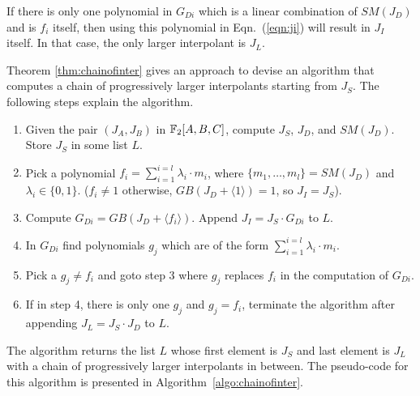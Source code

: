 If there is only one polynomial
in $G_{Di}$ which is a linear combination of $SM(J_D)$ and is $f_i$ itself, then using 
this polynomial in Eqn.~(\ref{eqn:ji}) will result in $J_I$ itself. In that case, 
the only larger interpolant is $J_L$.

\par Theorem \ref{thm:chainofinter} gives an approach to devise an algorithm that computes a chain of progressively larger interpolants starting from $J_S$. The following steps explain the algorithm.
\begin{enumerate}
	\item Given the pair $(J_A,J_B)$ in ${\mathbb{F}}_2[A,B,C]$, compute $J_S$, $J_D$, 
	and $SM(J_D)$. Store $J_S$ in some list $L$.
	\item Pick a polynomial $f_i = \sum_{i=1}^{i=l} \lambda_i \cdot m_i$, 
	where $\{m_1, \dots,m_l\} = SM(J_D)$ and $\lambda_i \in \{0,1\}$. ($f_i \neq 1$ otherwise,
	$GB(J_D + \langle 1 \rangle) =1$, so $J_I = J_S$).
	\item Compute $G_{Di} = GB(J_D + \langle f_i \rangle)$. Append $J_I = J_S\cdot G_{Di}$
	to $L$.
	\item In $G_{Di}$ find polynomials $g_j$ which are of the 
	form $\sum_{i=1}^{i=l} \lambda_i \cdot m_i$.
	\item Pick a $g_j \neq f_i$ and goto step 3 where $g_j$ replaces $f_i$
	in the computation of $G_{Di}$.
	\item If in step 4, there is only one $g_j$ and $g_j = f_i$,
	terminate the algorithm after appending $J_L = J_S \cdot J_D$ to $L$.
\end{enumerate} 
The algorithm returns the list $L$ whose first element is $J_S$ and last element is
$J_L$ with a chain of progressively larger interpolants in between.
The pseudo-code for this algorithm is presented in Algorithm~\ref{algo:chainofinter}. 



